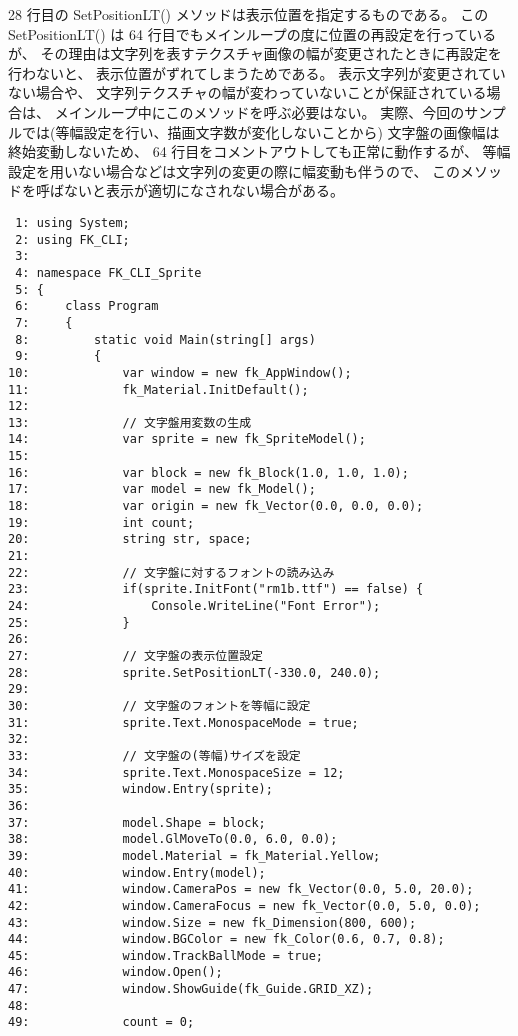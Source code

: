 28 行目の SetPositionLT() メソッドは表示位置を指定するものである。
この SetPositionLT() は 64 行目でもメインループの度に位置の再設定を行っているが、
その理由は文字列を表すテクスチャ画像の幅が変更されたときに再設定を行わないと、
表示位置がずれてしまうためである。
表示文字列が変更されていない場合や、
文字列テクスチャの幅が変わっていないことが保証されている場合は、
メインループ中にこのメソッドを呼ぶ必要はない。
実際、今回のサンプルでは(等幅設定を行い、描画文字数が変化しないことから)
文字盤の画像幅は終始変動しないため、
64 行目をコメントアウトしても正常に動作するが、
等幅設定を用いない場合などは文字列の変更の際に幅変動も伴うので、
このメソッドを呼ばないと表示が適切になされない場合がある。

\begin{breakbox}
\begin{small}
\begin{verbatim}
 1: using System;
 2: using FK_CLI;
 3: 
 4: namespace FK_CLI_Sprite
 5: {
 6:     class Program
 7:     {
 8:         static void Main(string[] args)
 9:         {
10:             var window = new fk_AppWindow();
11:             fk_Material.InitDefault();
12:             
13:             // 文字盤用変数の生成
14:             var sprite = new fk_SpriteModel();
15: 
16:             var block = new fk_Block(1.0, 1.0, 1.0);
17:             var model = new fk_Model();
18:             var origin = new fk_Vector(0.0, 0.0, 0.0);
19:             int count;
20:             string str, space;
21:  
22:             // 文字盤に対するフォントの読み込み
23:             if(sprite.InitFont("rm1b.ttf") == false) {
24:                 Console.WriteLine("Font Error");
25:             }
26: 
27:             // 文字盤の表示位置設定
28:             sprite.SetPositionLT(-330.0, 240.0);
29: 
30:             // 文字盤のフォントを等幅に設定
31:             sprite.Text.MonospaceMode = true;
32: 
33:             // 文字盤の(等幅)サイズを設定
34:             sprite.Text.MonospaceSize = 12;
35:             window.Entry(sprite);
36:  
37:             model.Shape = block;
38:             model.GlMoveTo(0.0, 6.0, 0.0);
39:             model.Material = fk_Material.Yellow;
40:             window.Entry(model);
41:             window.CameraPos = new fk_Vector(0.0, 5.0, 20.0);
42:             window.CameraFocus = new fk_Vector(0.0, 5.0, 0.0);
43:             window.Size = new fk_Dimension(800, 600);
44:             window.BGColor = new fk_Color(0.6, 0.7, 0.8);
45:             window.TrackBallMode = true;
46:             window.Open();
47:             window.ShowGuide(fk_Guide.GRID_XZ);
48:  
49:             count = 0;

\end{verbatim}
\end{small}
\end{breakbox}
